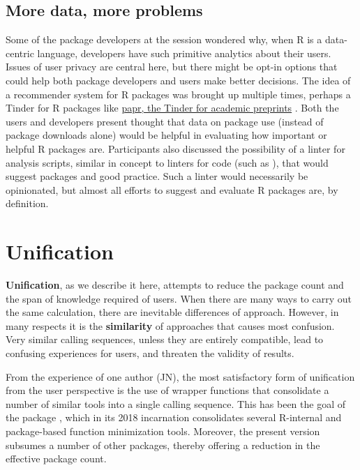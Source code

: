 \hypertarget{more-data-more-problems}{%
\subsection{More data, more problems}\label{more-data-more-problems}}

Some of the package developers at the session wondered why, when R is a
data-centric language, developers have such primitive analytics about
their users. Issues of user privacy are central here, but there might be
opt-in options that could help both package developers and users make
better decisions. The idea of a recommender system for R packages was
brought up multiple times, perhaps a Tinder for R packages like
\href{https://simplystatistics.org/2016/10/03/papr/}{papr, the Tinder
for academic preprints} \citep{papr}. Both the users and developers
present thought that data on package use (instead of package downloads
alone) would be helpful in evaluating how important or helpful R
packages are. Participants also discussed the possibility of a linter
for analysis scripts, similar in concept to linters for code (such as
\citet{lintr}), that would suggest packages and good practice. Such a
linter would necessarily be opinionated, but almost all efforts to
suggest and evaluate R packages are, by definition.

\hypertarget{unification}{%
\section{Unification}\label{unification}}

\textbf{Unification}, as we describe it here, attempts to reduce the
package count and the span of knowledge required of users. When there
are many ways to carry out the same calculation, there are inevitable
differences of approach. However, in many respects it is the
\textbf{similarity} of approaches that causes most confusion. Very
similar calling sequences, unless they are entirely compatible, lead to
confusing experiences for users, and threaten the validity of results.

From the experience of one author (JN), the most satisfactory form of
unification from the user perspective is the use of wrapper functions
that consolidate a number of similar tools into a single calling
sequence. This has been the goal of the package , which
in its 2018 incarnation consolidates several R-internal and
package-based function minimization tools. Moreover, the present version
subsumes a number of other packages, thereby offering a reduction in the
effective package count.

